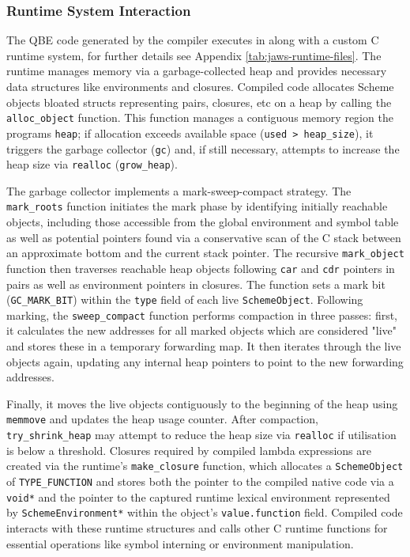 \documentclass[final]{cmpreport_02}
\begin{document}
\subsubsection{Runtime System Interaction}
The QBE code generated by the compiler executes in along with a custom C runtime system, for further details see Appendix \ref{tab:jaws-runtime-files}. The runtime manages memory via a garbage-collected heap and provides necessary data structures like environments and closures. Compiled code allocates Scheme objects bloated structs representing pairs, closures, etc on a heap by calling the \texttt{alloc\_object} function. This function manages a contiguous memory region the programs \texttt{heap}; if allocation exceeds available space (\texttt{used > heap\_size}), it triggers the garbage collector (\texttt{gc}) and, if still necessary, attempts to increase the heap size via \texttt{realloc} (\texttt{grow\_heap}).\newline

The garbage collector implements a mark-sweep-compact strategy. The \texttt{mark\_roots} function initiates the mark phase by identifying initially reachable objects, including those accessible from the global environment and symbol table as well as potential pointers found via a conservative scan of the C stack between an approximate bottom and the current stack pointer. The recursive \texttt{mark\_object} function then traverses reachable heap objects following \texttt{car} and \texttt{cdr} pointers in pairs as well as environment pointers in closures. The function sets a mark bit (\texttt{GC\_MARK\_BIT}) within the \texttt{type} field of each live \texttt{SchemeObject}. Following marking, the \texttt{sweep\_compact} function performs compaction in three passes: first, it calculates the new addresses for all marked objects which are considered "live" and stores these in a temporary forwarding map. It then iterates through the live objects again, updating any internal heap pointers to point to the new forwarding addresses.\newline

Finally, it moves the live objects contiguously to the beginning of the heap using \texttt{memmove} and updates the heap usage counter. After compaction, \texttt{try\_shrink\_heap} may attempt to reduce the heap size via \texttt{realloc} if utilisation is below a threshold. Closures required by compiled lambda expressions are created via the runtime's \texttt{make\_closure} function, which allocates a \texttt{SchemeObject} of \texttt{TYPE\_FUNCTION} and stores both the pointer to the compiled native code via a \texttt{void*} and the pointer to the captured runtime lexical environment represented by \texttt{SchemeEnvironment*} within the object's \texttt{value.function} field. Compiled code interacts with these runtime structures and calls other C runtime functions for essential operations like symbol interning or environment manipulation.
\end{document}
